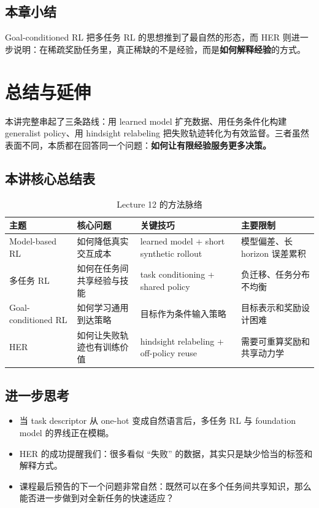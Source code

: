 \documentclass[a4paper]{article}
\begin{document}
\subsection{本章小结}

Goal-conditioned RL 把多任务 RL 的思想推到了最自然的形态，而 HER 则进一步说明：在稀疏奖励任务里，真正稀缺的不是经验，而是\textbf{如何解释经验}的方式。

\section{总结与延伸}

本讲完整串起了三条路线：用 learned model 扩充数据、用任务条件化构建 generalist policy、用 hindsight relabeling 把失败轨迹转化为有效监督。三者虽然表面不同，本质都在回答同一个问题：\textbf{如何让有限经验服务更多决策。}

\subsection{本讲核心总结表}

\begin{table}[H]
\centering
\begin{tabular}{p{} p{} p{} p{}}
\toprule
主题 & 核心问题 & 关键技巧 & 主要限制 \\
\midrule
Model-based RL & 如何降低真实交互成本 & learned model + short synthetic rollout & 模型偏差、长 horizon 误差累积 \\
多任务 RL & 如何在任务间共享经验与技能 & task conditioning + shared policy & 负迁移、任务分布不均衡 \\
Goal-conditioned RL & 如何学习通用到达策略 & 目标作为条件输入策略 & 目标表示和奖励设计困难 \\
HER & 如何让失败轨迹也有训练价值 & hindsight relabeling + off-policy reuse & 需要可重算奖励和共享动力学 \\
\bottomrule
\end{tabular}
\caption{Lecture 12 的方法脉络}
\end{table}

\subsection{进一步思考}

\begin{itemize}
    \item 当 task descriptor 从 one-hot 变成自然语言后，多任务 RL 与 foundation model 的界线正在模糊。
    \item HER 的成功提醒我们：很多看似 ``失败'' 的数据，其实只是缺少恰当的标签和解释方式。
    \item 课程最后预告的下一个问题非常自然：既然可以在多个任务间共享知识，那么能否进一步做到对全新任务的快速适应？
\end{itemize}
\end{document}
